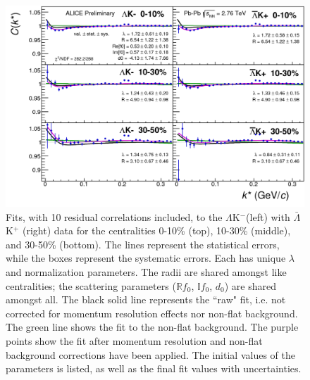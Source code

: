 \documentclass[../AnalysisNoteJBuxton.tex]{subfiles}
\begin{document}
\begin{figure}[h]
  \centering
  \includegraphics[width=\textwidth]{7_ResultsAndDiscussion/Figures/canKStarCfwFitsLamKchMwConj_0010_1030_3050_MomResCrctn_NonFlatBgdCrctn_10Res_PrimMaxDecay4fm_UsingXiDataAndCoulombOnly.pdf}
  \caption[$\Lambda$K$^{-}$($\bar{\Lambda}$K$^{+}$) Fits with 10 Residuals]{Fits, with 10 residual correlations included, to the $\Lambda$K$^{-}$(left) with $\bar{\Lambda}$K$^{+}$ (right) data for the centralities 0-10\% (top), 10-30\% (middle), and 30-50\% (bottom).
The lines represent the statistical errors, while the boxes represent the systematic errors.  
Each has unique $\lambda$ and normalization parameters.
The radii are shared amongst like centralities; the scattering parameters ($\mathbb{R}f_{0}$, $\mathbb{I}f_{0}$, $d_{0}$) are shared amongst all.
The black solid line represents the ``raw" fit, i.e. not corrected for momentum resolution effects nor non-flat background.  
The green line shows the fit to the non-flat background.
The purple points show the fit after momentum resolution and non-flat background corrections have been applied.
The initial values of the parameters is listed, as well as the final fit values with uncertainties.}
  \label{fig:LamKchMwConjFits_10Res}
\end{figure}
\end{document}

